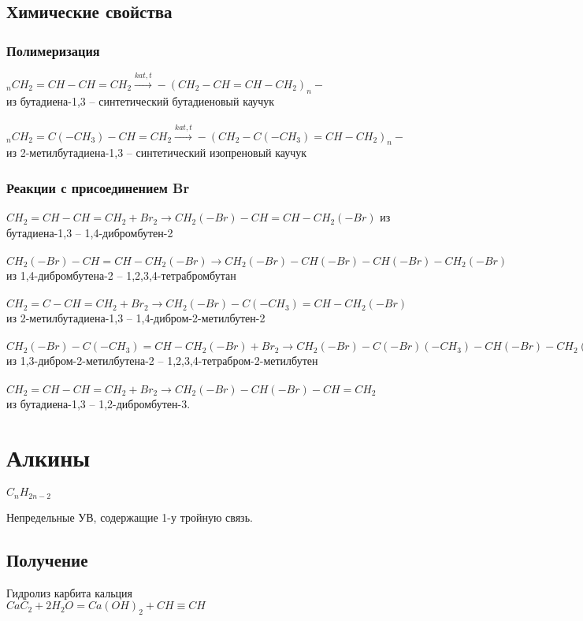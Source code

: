 \documentclass[a4paper]{article}
\begin{document}
\subsection{Химические свойства}
	\subsubsection{Полимеризация}
	$_nCH_{2}=CH-CH=CH_{2} \xrightarrow{kat,t} -(CH_{2}-CH=CH-CH_{2})_n-$\\
	из бутадиена-1,3 -- синтетический бутадиеновый каучук\\\\
	$_nCH_{2}=C(-CH_{3})-CH=CH_2 \xrightarrow{kat,t}
	-(CH_2-C(-CH_3)=CH-CH_2)_n-$\\
	из 2-метилбутадиена-1,3 -- синтетический изопреновый каучук
	\subsubsection{Реакции с присоединением Br}
	$CH_2=CH-CH=CH_2 + Br_2 \xrightarrow{} CH_2(-Br)-CH=CH-CH_2(-Br)$
	из бутадиена-1,3 -- 1,4-дибромбутен-2\\\\
	$CH_2(-Br)-CH=CH-CH_2(-Br) \xrightarrow{}
	CH_2(-Br)-CH(-Br)-CH(-Br)-CH_2(-Br)$\\
	из 1,4-дибромбутена-2 -- 1,2,3,4-тетрабромбутан\\\\
	$CH_2=C-CH=CH_2+Br_2 \xrightarrow{} CH_2(-Br)-C(-CH_3)=CH-CH_2(-Br)$\\
	из 2-метилбутадиена-1,3 -- 1,4-дибром-2-метилбутен-2\\\\
	$CH_2(-Br)-C(-CH_3)=CH-CH_2(-Br)+Br_2 \xrightarrow{}
	CH_2(-Br)-C(-Br)(-CH_3)-CH(-Br)-CH_2(-Br)$\\
	из 1,3-дибром-2-метилбутена-2 -- 1,2,3,4-тетрабром-2-метилбутен\\\\
	$CH_2=CH-CH=CH_2+Br_2 \xrightarrow{} CH_2(-Br)-CH(-Br)-CH=CH_2$\\
	из бутадиена-1,3 -- 1,2-дибромбутен-3.
\pagebreak

\section{Алкины} \begin{flushright} $C_{n}H_{2n-2}$ \end{flushright}
Непредельные УВ, содержащие 1-у тройную связь.
\subsection{Получение}
Гидролиз карбита кальция\\
$CaC_2+2H_2O=Ca(OH)_2+CH\equiv CH$\\
\end{document}
